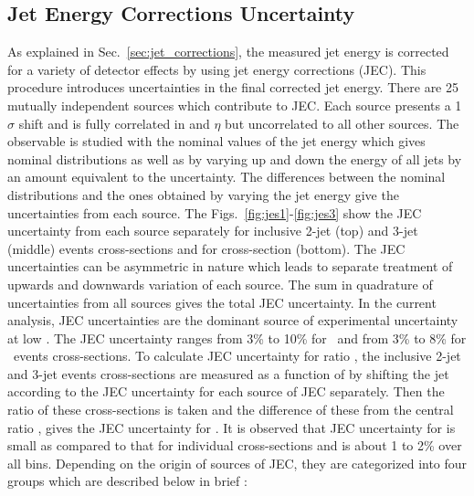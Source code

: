 \subsection{Jet Energy Corrections Uncertainty}
\label{sec:jecs_unc}
As explained in Sec.~\ref{sec:jet_corrections}, the measured jet energy is corrected for a variety of detector effects by using jet energy corrections (JEC). This procedure introduces uncertainties in the final corrected jet energy. There are 25 mutually independent sources which contribute to JEC. Each source presents a 1$\sigma$ shift and is fully correlated in \pt and $\eta$ but uncorrelated to all other sources. The observable is studied with the nominal values of the jet energy which gives nominal distributions as well as by varying up and down the energy of all jets by an amount equivalent to the uncertainty. The differences between the nominal distributions and the ones obtained by varying the jet energy give the uncertainties from each source. The Figs.~\ref{fig:jes1}-\ref{fig:jes3} show the JEC uncertainty from each source separately for inclusive 2-jet (top) and 3-jet (middle) events cross-sections and for cross-section \ratio (bottom). The JEC uncertainties can be asymmetric in nature which leads to separate treatment of upwards and downwards variation of each source. The sum in quadrature of uncertainties from all sources gives the total JEC uncertainty. In the current analysis, JEC uncertainties are the dominant source of experimental uncertainty at low \httwo. The JEC uncertainty ranges from 3\% to 10\% for \njt~and from 3\% to 8\% for \njth~events cross-sections. To calculate JEC uncertainty for ratio \rations, the inclusive 2-jet and 3-jet events cross-sections are measured as a function of \httwo by shifting the jet \pt according to the JEC uncertainty for each source of JEC separately. Then the ratio of these cross-sections is taken and the difference of these from the central ratio \rations, gives the JEC uncertainty for \ratio. It is observed that JEC uncertainty for \ratio is small as compared to that for individual cross-sections and is about 1 to 2\% over all \httwo bins. Depending on the origin of sources of JEC, they are categorized into four groups which are described below in brief : %
